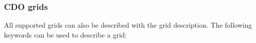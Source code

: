



\subsubsection{CDO grids}

All supported grids can also be described with the {\CDO} grid description.
The following keywords can be used to describe a grid:

